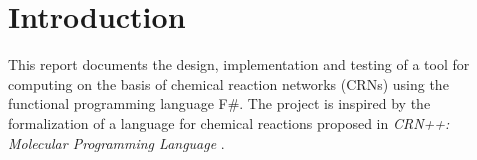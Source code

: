 \section{Introduction}
This report documents the design, implementation and testing of a tool for computing on the basis of chemical reaction networks (CRNs) using the functional programming language F\#. The project is inspired by the formalization of a language for chemical reactions proposed in \textit{CRN++: Molecular Programming Language} \cite{soloveichik2018a}. 